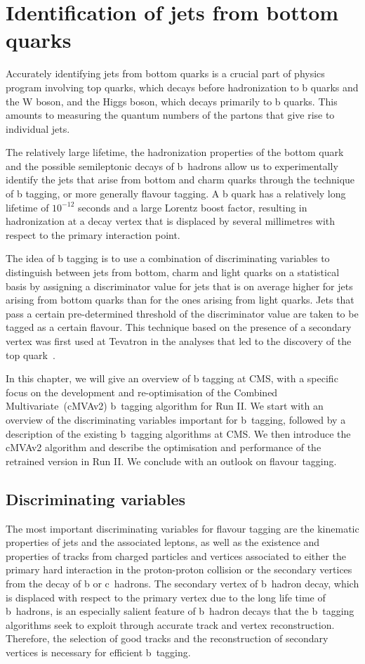 \chapter{Identification of jets from bottom quarks}
Accurately identifying jets from bottom quarks is a crucial part of physics program involving top quarks, which decays before hadronization to b quarks and the W boson, and the Higgs boson, which decays primarily to b quarks. This amounts to measuring the quantum numbers of the partons that give rise to individual jets.

The relatively large lifetime, the hadronization properties of the bottom quark and the possible semileptonic decays of b~hadrons allow us to experimentally identify the jets that arise from bottom and charm quarks through the technique of b tagging, or more generally flavour tagging. A b quark has a relatively long lifetime of $10^{-12}$ seconds and a large Lorentz boost factor, resulting in hadronization at a decay vertex that is displaced by several millimetres with respect to the primary interaction point.

The idea of b tagging is to use a combination of discriminating variables to distinguish between jets from bottom, charm and light quarks on a statistical basis by assigning a discriminator value for jets that is on average higher for jets arising from bottom quarks than for the ones arising from light quarks. Jets that pass a certain pre-determined threshold of the discriminator value are taken to be tagged as a certain flavour. This technique based on the presence of a secondary vertex was first used at Tevatron in the analyses that led to the discovery of the top quark~\cite{Abe:1994st,Abe:1995hr}.

In this chapter, we will give an overview of b tagging at CMS, with a specific focus on the development and re-optimisation of the Combined Multivariate~(cMVAv2) b~tagging algorithm for Run II. We start with an overview of the discriminating variables important for b~tagging, followed by a description of the existing b~tagging algorithms at CMS. We then introduce the cMVAv2 algorithm and describe the optimisation and performance of the retrained version in Run II. We conclude with an outlook on flavour tagging. 

\section{Discriminating variables}
The most important discriminating variables for flavour tagging are the kinematic properties of jets and the associated leptons, as well as the existence and properties of tracks from charged particles and vertices associated to either the primary hard interaction in the proton-proton collision or the secondary vertices from the decay of b or c~hadrons. The secondary vertex of b~hadron decay, which is displaced with respect to the primary vertex due to the long life time of b~hadrons, is an especially salient feature of b~hadron decays that the b~tagging algorithms seek to exploit through accurate track and vertex reconstruction. Therefore, the selection of good tracks and the reconstruction of secondary vertices is necessary for efficient b~tagging.

